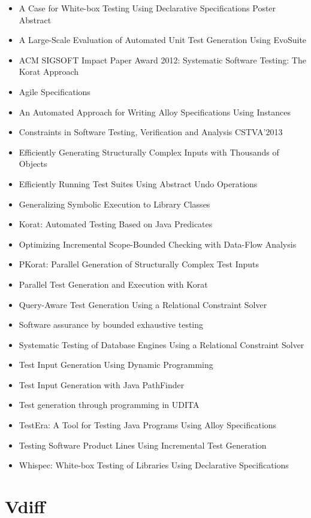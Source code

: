 \begin{itemize}
\item A Case for White-box Testing Using Declarative Specifications Poster Abstract
\item A Large-Scale Evaluation of Automated Unit Test Generation Using EvoSuite
\item ACM SIGSOFT Impact Paper Award 2012: Systematic Software Testing: The Korat Approach
\item Agile Specifications
\item An Automated Approach for Writing Alloy Specifications Using Instances
\item Constraints in Software Testing, Verification and Analysis CSTVA'2013
\item Efficiently Generating Structurally Complex Inputs with Thousands of Objects
\item Efficiently Running Test Suites Using Abstract Undo Operations
\item Generalizing Symbolic Execution to Library Classes
\item Korat: Automated Testing Based on Java Predicates
\item Optimizing Incremental Scope-Bounded Checking with Data-Flow Analysis
\item PKorat: Parallel Generation of Structurally Complex Test Inputs
\item Parallel Test Generation and Execution with Korat
\item Query-Aware Test Generation Using a Relational Constraint Solver
\item Software assurance by bounded exhaustive testing
\item Systematic Testing of Database Engines Using a Relational Constraint Solver
\item Test Input Generation Using Dynamic Programming
\item Test Input Generation with Java PathFinder
\item Test generation through programming in UDITA
\item TestEra: A Tool for Testing Java Programs Using Alloy Specifications
\item Testing Software Product Lines Using Incremental Test Generation
\item Whispec: White-box Testing of Libraries Using Declarative Specifications
\end{itemize}


\section{Vdiff}

